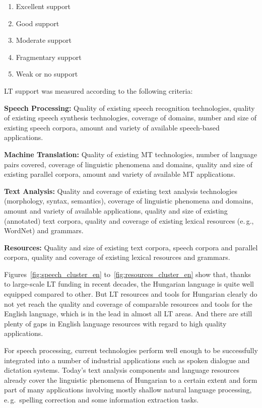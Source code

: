 \begin{multicols}{2}
  \begin{enumerate}
  \item Excellent support
  \item Good support
  \item Moderate support
  \item Fragmentary support
  \item Weak or no support
  \end{enumerate}

  LT support was measured according to the following criteria:

  \textbf{Speech Processing:} Quality of existing speech recognition technologies, quality of existing speech synthesis technologies, coverage of domains, number and size of existing speech corpora, amount and variety of available speech-based applications.

  \textbf{Machine Translation:} Quality of existing MT technologies, number of language pairs covered, coverage of linguistic phenomena and domains, quality and size of existing parallel corpora, amount and variety of available MT applications.

  \textbf{Text Analysis:} Quality and coverage of existing text analysis technologies (morphology, syntax, semantics), coverage of linguistic phenomena and domains, amount and variety of available applications, quality and size of existing (annotated) text corpora, quality and coverage of existing lexical resources (e.\,g., WordNet) and grammars.

  \textbf{Resources:} Quality and size of existing text corpora, speech corpora and parallel corpora, quality and coverage of existing lexical resources and grammars.

  Figures~\ref{fig:speech_cluster_en} to~\ref{fig:resources_cluster_en} show that, thanks to large-scale LT funding in recent decades, the Hungarian language is quite well equipped compared to other. But LT resources and tools for Hungarian clearly do not yet reach the quality and coverage of comparable resources and tools for the English language, which is in the lead in almost all LT areas. And there are still plenty of gaps in English language resources with regard to high quality applications.

  For speech processing, current technologies perform well enough to be successfully integrated into a number of industrial applications such as spoken dialogue and dictation systems. Today's text analysis components and language resources already cover the linguistic phenomena of Hungarian to a certain extent and form part of many applications involving mostly shallow natural language processing, e.\,g.~spelling correction and some information extraction tasks.


\end{multicols}
